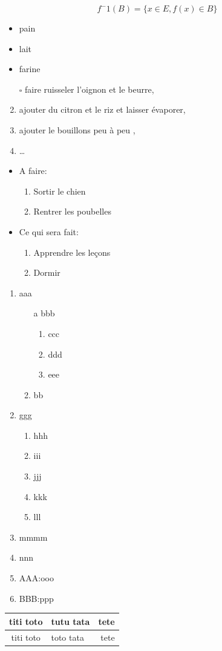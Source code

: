 \documentclass[12pt,a4paper]{article}
\begin{document}
$$ f^-1(B)=\{x \in E , f(x) \in B \} $$
\begin{itemize}
\item pain
\item lait
\item farine
\end{itemize}
\begin{enumerate}
\item [$\square $]faire ruisseler l'oignon et le beurre,
\item ajouter du citron et le riz et laisser évaporer,
\item ajouter le bouillons peu à peu ,
\item\dots
\end{enumerate}
\begin{itemize}
\item A faire:
\begin{enumerate}
\item Sortir le chien\item Rentrer les poubelles
\end{enumerate}
\item Ce qui sera fait:
\begin{enumerate}
\item Apprendre les leçons
\item Dormir
\end{enumerate}
\end{itemize}
\newpage
\begin{enumerate}
\item aaa
\begin{enumerate}
\item[a] bbb
\begin{enumerate}
\item ccc
\item ddd
\item eee
\end{enumerate}
\item bb
\end{enumerate}
\item ggg
\begin{enumerate}
\item hhh
\item  iii
\item  jjj
\item  kkk
\item  lll
\end{enumerate}
\item mmmm
\item nnn
\item AAA:ooo
\item BBB:ppp
\end{enumerate}
\begin{tabular}{|c|p{2cm}|r|}
\hline
titi toto & tutu tata  & tete\\
\hline
titi toto & toto tata  & tete\\
\hline
\end{tabular}
 
\end{document}
